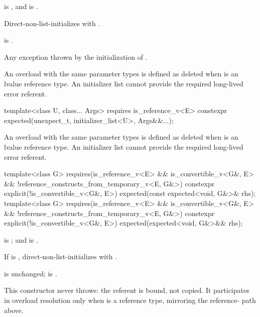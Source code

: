 \begin{itemdescr}
\pnum
\constraints
{} is , and  is .

\pnum
\effects
Direct-non-list-initializes  with .

\pnum
\ensures
{} is .

\pnum
\throws
Any exception thrown by the initialization of .

\pnum
\remarks
An overload with the same parameter types is defined as deleted when  is an lvalue reference type. An initializer list cannot provide the required long-lived error referent.
\end{itemdescr}

%
\begin{itemdecl}
template<class U, class... Args>
  requires is_reference_v<E>
constexpr expected(unexpect_t, initializer_list<U>, Args&&...);
\end{itemdecl}

\begin{itemdescr}
\pnum
\remarks
An overload with the same parameter types is defined as deleted when  is an lvalue reference type. An initializer list cannot provide the required long-lived error referent.
\end{itemdescr}

%
\begin{itemdecl}
template<class G>
  requires(is_reference_v<E> && is_convertible_v<G&, E> &&
           !reference_constructs_from_temporary_v<E, G&>)
constexpr explicit(!is_convertible_v<G&, E>) expected(const expected<void, G&>& rhs);
template<class G>
  requires(is_reference_v<E> && is_convertible_v<G&, E> &&
           !reference_constructs_from_temporary_v<E, G&>)
constexpr explicit(!is_convertible_v<G&, E>) expected(expected<void, G&>&& rhs);
\end{itemdecl}

\begin{itemdescr}
\pnum
\constraints
{} is ; and  is .

\pnum
\effects
If  is , direct-non-list-initializes  with .

\pnum
\ensures
{} is unchanged;  is .

\pnum
\remarks
This constructor never throws: the referent is bound, not copied. It participates in overload resolution only when  is a reference type, mirroring the  reference- path above.
\end{itemdescr}

